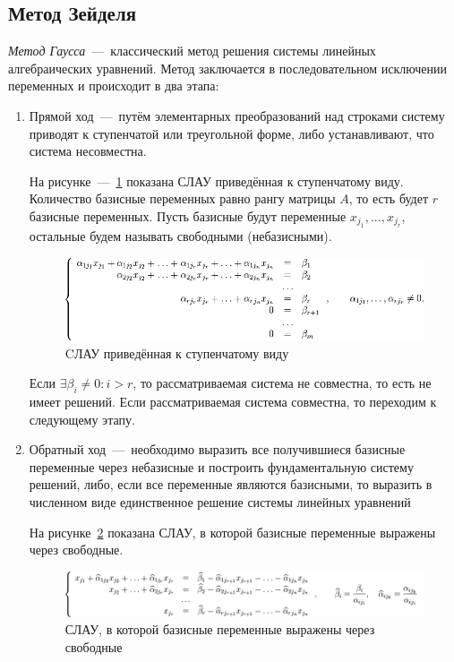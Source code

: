 \documentclass[12pt,a4paper,oneside]{extarticle}
\begin{document}
    \subsection{Метод Зейделя}
        {\it Метод Гаусса}~---~классический метод решения системы линейных алгебраических уравнений. Метод заключается в последовательном исключении переменных и происходит в два этапа:
        \begin{enumerate}
            \item Прямой ход~---~путём элементарных преобразований над строками систему приводят к ступенчатой или треугольной форме, либо устанавливают, что система несовместна.

                На рисунке~---~\ref{pic:gaussian1} показана СЛАУ приведённая к ступенчатому виду. Количество базисные переменных равно рангу матрицы $A$, то есть будет $r$ базисные переменных. Пусть базисные будут переменные $x_{j_1}, ..., x_{j_r}$, остальные будем называть свободными (небазисными). 
                \begin{figure}[h!]
                    \centering
                    \includegraphics[scale=0.65]{gaussian1.png}
                    \caption{CЛАУ приведённая к ступенчатому виду}
                    \label{pic:gaussian1}
                \end{figure}

                Если $\exists \beta_i \neq 0 \colon i>r$, то рассматриваемая система не совместна, то есть не имеет решений. Если рассматриваемая система совместна, то переходим к следующему этапу.

            \item Обратный ход~---~необходимо выразить все получившиеся базисные переменные через небазисные и построить фундаментальную систему решений, либо, если все переменные являются базисными, то выразить в численном виде единственное решение системы линейных уравнений

                На рисунке~\ref{pic:gaussian2} показана СЛАУ, в которой базисные переменные выражены через свободные.
                \begin{figure}[h!]
                    \centering
                    \includegraphics[scale=0.45]{gaussian2.png}
                    \caption{СЛАУ, в которой базисные переменные выражены через свободные}
                    \label{pic:gaussian2}
                \end{figure}


\end{enumerate}
\end{document}
